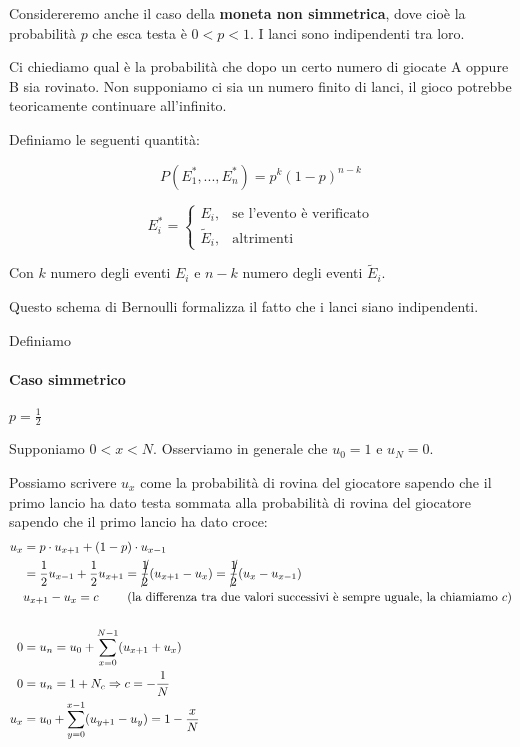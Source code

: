 \documentclass[a4paper,12pt]{book}
\newcommand\ddfrac[2]{\frac{\displaystyle #1}{\displaystyle #2}}
\begin{document}
Considereremo anche il caso della \textbf{moneta non simmetrica}, dove cioè la probabilità $ p $ che esca testa è $ 0 < p < 1 $. I lanci sono indipendenti tra loro.

Ci chiediamo qual è la probabilità che dopo un certo numero di giocate A oppure B sia rovinato. Non supponiamo ci sia un numero finito di lanci, il gioco potrebbe teoricamente continuare all'infinito. 

Definiamo le seguenti quantità:

$$ P(E^*_1, ..., E^*_n) = p^k(1-p)^{n-k} $$


\begin{equation}
	E^*_i=
	\begin{cases}
		E_i, & \text{se l'evento è verificato}  \\
		\tilde{E}_i, & \text{altrimenti}
	\end{cases}
\end{equation}

Con $ k $ numero degli eventi $ E_i $ e $ n-k $ numero degli eventi $ \tilde{E}_i $.

Questo schema di Bernoulli formalizza il fatto che i lanci siano indipendenti. 

Definiamo


\paragraph{Caso simmetrico } $ p = \ddfrac{1}{2} $

Supponiamo $ 0 < x < N $. Osserviamo in generale che $ u_0 = 1 $ e $ u_N = 0 $.

Possiamo scrivere $ u_x $ come la probabilità di rovina del giocatore sapendo che il primo lancio ha dato testa sommata alla probabilità di rovina del giocatore sapendo che il primo lancio ha dato croce:
\begin{align*}
	u_x & = p\cdot u_{x+1} + (1-p)\cdot u_{x-1} \\
	& = \frac{1}{2}u_{x-1} + \frac{1}{2}u_{x+1} = \cancel{\frac{1}{2}}(u_{x+1} - u_{x}) = \cancel{\frac{1}{2}}(u_x - u_{x-1}) \\
	& u_{x+1} - u_x = c \text{ \qquad (la differenza tra due valori successivi è sempre uguale, la chiamiamo } c) \\ \\
	0 & = u_n = u_0 + \sum_{x=0}^{N-1}(u_{x+1} + u_x)\\
	0 & = u_n = 1 + N_c \Rightarrow c = -\frac{1}{N} \\
	u_x & = u_0 + \sum_{y=0}^{x-1} (u_{y+1} - u_y) = 1 - \frac{x}{N}
\end{align*}
\end{document}

